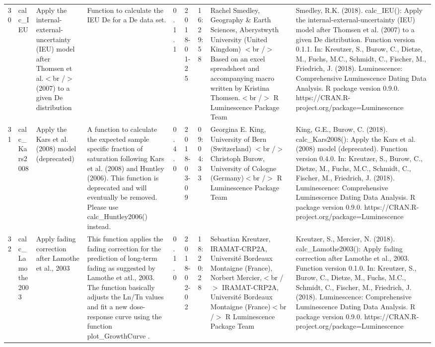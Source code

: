\begin{table}[ht]
\begin{tabular}{rllllllll}
 \\ 
  30 & calc\_IEU & Apply the internal-external-uncertainty (IEU) model after Thomsen et al.$<$br /$>$ (2007) to a given De distribution & Function to calculate the IEU De for a De data set. & 0.1.1 & 2018-01-25 & 16:29:58
 & Rachel Smedley, Geography \& Earth Sciences, Aberystwyth University (United Kingdom)  $<$br /$>$ Based on an excel spreadsheet and accompanying macro written by Kristina Thomsen.$<$br /$>$  R Luminescence Package Team & Smedley, R.K. (2018). calc\_IEU(): Apply the internal-external-uncertainty (IEU) model after Thomsen et al. (2007) to a given De distribution. Function version 0.1.1. In: Kreutzer, S., Burow, C., Dietze, M., Fuchs, M.C., Schmidt, C., Fischer, M., Friedrich, J. (2018). Luminescence: Comprehensive Luminescence Dating Data Analysis. R package version 0.9.0. https://CRAN.R-project.org/package=Luminescence
 \\ 
  31 & calc\_Kars2008 & Apply the Kars et al. (2008) model (deprecated) & A function to calculate the expected sample specific fraction of saturation following Kars et al. (2008) and Huntley (2006). This function is deprecated and will eventually be removed. Please use  calc\_Huntley2006()  instead. & 0.4.0 & 2018-03-09 & 09:04:33
 & Georgina E. King, University of Bern (Switzerland)  $<$br /$>$ Christoph Burow, University of Cologne (Germany)$<$br /$>$  R Luminescence Package Team & King, G.E., Burow, C. (2018). calc\_Kars2008(): Apply the Kars et al. (2008) model (deprecated). Function version 0.4.0. In: Kreutzer, S., Burow, C., Dietze, M., Fuchs, M.C., Schmidt, C., Fischer, M., Friedrich, J. (2018). Luminescence: Comprehensive Luminescence Dating Data Analysis. R package version 0.9.0. https://CRAN.R-project.org/package=Luminescence
 \\ 
  32 & calc\_Lamothe2003 & Apply fading correction after Lamothe et al., 2003 & This function applies the fading correction for the prediction of long-term fading as suggested by Lamothe et atl., 2003. The function basically adjusts the Ln/Tn values and fit a new dose-response curve using the function  plot\_GrowthCurve . & 0.1.0 & 2018-02-02 & 18:20:28
 & Sebastian Kreutzer, IRAMAT-CRP2A, Université Bordeaux Montaigne (France), Norbert Mercier,$<$br /$>$ IRAMAT-CRP2A, Université Bordeaux Montaigne (France)$<$br /$>$  R Luminescence Package Team & Kreutzer, S., Mercier, N. (2018). calc\_Lamothe2003(): Apply fading correction after Lamothe et al., 2003. Function version 0.1.0. In: Kreutzer, S., Burow, C., Dietze, M., Fuchs, M.C., Schmidt, C., Fischer, M., Friedrich, J. (2018). Luminescence: Comprehensive Luminescence Dating Data Analysis. R package version 0.9.0. https://CRAN.R-project.org/package=Luminescence

\end{tabular}
\end{table}
